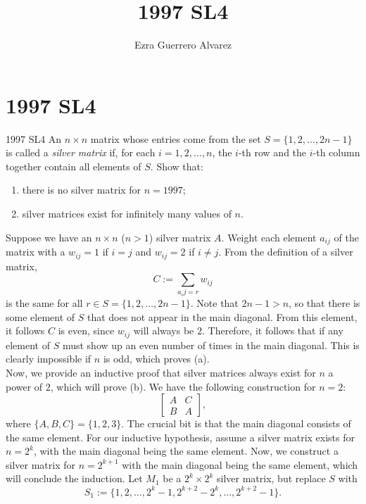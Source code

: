 \documentclass[14pt]{article}
\title{1997 SL4}
\author{Ezra Guerrero Alvarez}
\begin{document}
\maketitle
	
\section*{1997 SL4}

\begin{statement}{1997 SL4}
	An $ n \times n$ matrix whose entries come from the set $ S = \{1, 2, \ldots , 2n - 1\}$ is called a \textit{silver matrix} if, for each $ i = 1, 2, \ldots , n$, the $ i$-th row and the $ i$-th column together contain all elements of $ S$. Show that:
	\begin{enumerate}[label=(\alph*)]
		\item there is no silver matrix for $ n = 1997$;
		\item silver matrices exist for infinitely many values of $ n$.
	\end{enumerate}
\end{statement}
Suppose we have an $n\times n$ ($n>1$) silver matrix $A$. Weight each element $a_{ij}$ of the matrix with a $w_{ij}=1$ if $i=j$ and $w_{ij}=2$ if $i\ne j$. From the definition of a silver matrix, 
\[ C:=\sum_{a_ij=r}w_{ij} \]
is the same for all $r\in S=\{1,2,\ldots,2n-1\}$. Note that $2n-1>n$, so that there is some element of $S$ that does not appear in the main diagonal. From this element, it follows $C$ is even, since $w_{ij}$ will always be $2$. Therefore, it follows that if any element of $S$ must show up an even number of times in the main diagonal. This is clearly impossible if $n$ is odd, which proves (a).\\
Now, we provide an inductive proof that silver matrices always exist for $n$ a power of $2$, which will prove (b). We have the following construction for $n=2$:
\[ \begin{bmatrix}
	A&C\\
	B&A
\end{bmatrix}, \]
where $\{A,B,C\}=\{1,2,3\}$. The crucial bit is that the main diagonal consists of the same element. For our inductive hypothesis, assume a silver matrix exists for $n=2^k$, with the main diagonal being the same element. Now, we construct a silver matrix for $n=2^{k+1}$ with the main diagonal being the same element, which will conclude the induction. Let $M_1$ be a $2^k\times 2^k$ silver matrix, but replace $S$ with
\[S_1:=\{1,2,\ldots,2^k-1,2^{k+2}-2^k,\ldots,2^{k+2}-1\}.\]
\end{document}
